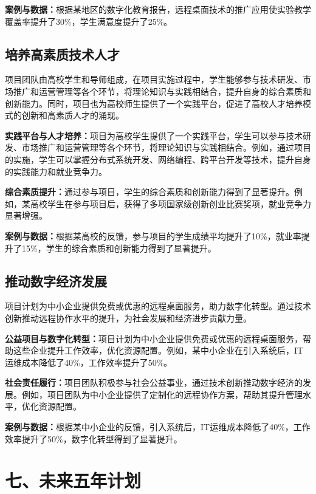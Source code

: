 \documentclass[12pt,a4paper]{article}
\begin{document}
\textbf{案例与数据：}根据某地区的数字化教育报告，远程桌面技术的推广应用使实验教学覆盖率提升了30\%，学生满意度提升了25\%。

\subsection{培养高素质技术人才}
项目团队由高校学生和导师组成，在项目实施过程中，学生能够参与技术研发、市场推广和运营管理等各个环节，将理论知识与实践相结合，提升自身的综合素质和创新能力。同时，项目也为高校师生提供了一个实践平台，促进了高校人才培养模式的创新和高素质人才的涌现。

\textbf{实践平台与人才培养：}项目为高校学生提供了一个实践平台，学生可以参与技术研发、市场推广和运营管理等各个环节，将理论知识与实践相结合。例如，通过项目的实施，学生可以掌握分布式系统开发、网络编程、跨平台开发等技术，提升自身的实践能力和就业竞争力。

\textbf{综合素质提升：}通过参与项目，学生的综合素质和创新能力得到了显著提升。例如，某高校学生在参与项目后，获得了多项国家级创新创业比赛奖项，就业竞争力显著增强。

\textbf{案例与数据：}根据某高校的反馈，参与项目的学生成绩平均提升了10\%，就业率提升了15\%，学生的综合素质和创新能力得到了显著提升。

\subsection{推动数字经济发展}
项目计划为中小企业提供免费或优惠的远程桌面服务，助力数字化转型。通过技术创新推动远程协作水平的提升，为社会发展和经济进步贡献力量。

\textbf{公益项目与数字化转型：}项目计划为中小企业提供免费或优惠的远程桌面服务，帮助这些企业提升工作效率，优化资源配置。例如，某中小企业在引入系统后，IT运维成本降低了40\%，工作效率提升了50\%。

\textbf{社会责任履行：}项目团队积极参与社会公益事业，通过技术创新推动数字经济的发展。例如，项目团队为中小企业提供了定制化的远程协作方案，帮助其提升管理水平，优化资源配置。

\textbf{案例与数据：}根据某中小企业的反馈，引入系统后，IT运维成本降低了40\%，工作效率提升了50\%，数字化转型得到了显著提升。

\section{七、未来五年计划}
\end{document}
